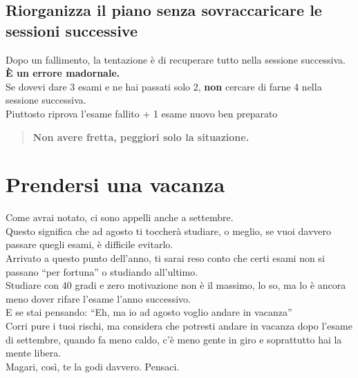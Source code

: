 \documentclass[18pt]{extarticle}
\begin{document}
\subsection{Riorganizza il piano senza sovraccaricare le sessioni successive}
Dopo un fallimento, la tentazione è di recuperare tutto nella sessione successiva.\\
\textbf{È un errore madornale.}\\
Se dovevi dare 3 esami e ne hai passati solo 2, \textbf{non} cercare di farne 4 nella sessione successiva.\\
Piuttosto riprova l'esame fallito + 1 esame nuovo ben preparato
\begin{quote}
\textbf{Non avere fretta, peggiori solo la situazione.}
\end{quote}


\section{Prendersi una vacanza}
Come avrai notato, ci sono appelli anche a settembre.\\
Questo significa che ad agosto ti toccherà studiare, o meglio, se vuoi davvero passare quegli esami, è difficile evitarlo.\\
Arrivato a questo punto dell'anno, ti sarai reso conto che certi esami non si passano ``per fortuna'' o studiando all'ultimo.\\
Studiare con 40 gradi e zero motivazione non è il massimo, lo so, ma lo è ancora meno dover rifare l'esame l'anno successivo.\\
E se stai pensando: ``Eh, ma io ad agosto voglio andare in vacanza''\\
Corri pure i tuoi rischi, ma considera che potresti andare in vacanza dopo l'esame di settembre, quando fa meno caldo, c'è meno gente in giro e soprattutto hai la mente libera.\\
Magari, così, te la godi davvero. Pensaci.

\clearpage
\end{document}
